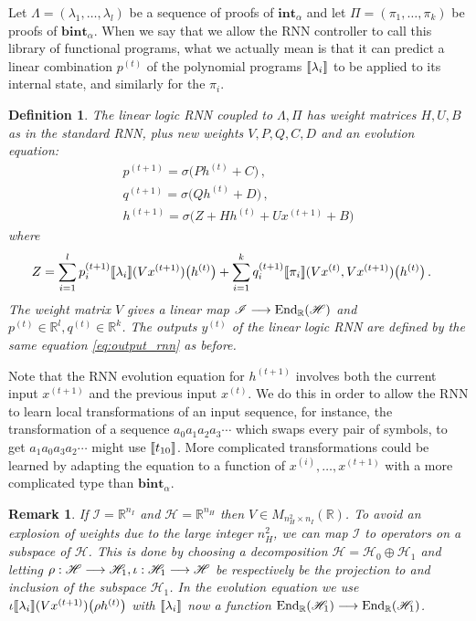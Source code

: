 \documentclass[english,letter paper,12pt,leqno]{article}
\theoremstyle{example}
\newtheorem{definition}[theorem]{Definition}
\newtheorem{remark}[theorem]{Remark}
\numberwithin{equation}{section}
\DeclareMathOperator{\End}{End}
\begin{document}
Let $\Lambda = (\lambda_1,\ldots,\lambda_l)$ be a sequence of proofs of $\textbf{int}_\alpha$ and let $\Pi = (\pi_1,\ldots,\pi_k)$ be proofs of $\textbf{bint}_\alpha$. When we say that we allow the RNN controller to call this library of functional programs, what we actually mean is that it can predict a linear combination $p^{(t)}$ of the polynomial programs $\llbracket \lambda_i \rrbracket$ to be applied to its internal state, and similarly for the $\pi_i$.

\begin{definition} The \emph{linear logic} RNN coupled to $\Lambda, \Pi$ has weight matrices $H,U,B$ as in the standard RNN, plus new weights $V, P, Q, C, D$ and an evolution equation:
\begin{gather*}
p^{(t+1)} = \sigma\big( P h^{(t)} + C \big)\,,\\
q^{(t+1)} = \sigma\big( Q h^{(t)} + D \big)\,,\\
h^{(t+1)} = \sigma\Big( Z + H h^{(t)} + U x^{(t+1)} + B\Big)
\end{gather*}
where
\begin{align*}
Z &= \sum_{i=1}^l p^{(t+1)}_i \llbracket \lambda_i \rrbracket( Vx^{(t+1)} )\big( h^{(t)} \big) + \sum_{i=1}^k q^{(t+1)}_i \llbracket \pi_i \rrbracket( Vx^{(t)}, Vx^{(t+1)})\big( h^{(t)} \big)\,.
\end{align*}
The weight matrix $V$ gives a linear map $\mathscr{I} \lto \End_{\mathbb{R}}(\mathscr{H})$ and $p^{(t)} \in \mathbb{R}^l, q^{(t)} \in \mathbb{R}^k$. The outputs $y^{(t)}$ of the linear logic RNN are defined by the same equation \eqref{eq:output_rnn} as before.
\end{definition}

Note that the RNN evolution equation for $h^{(t+1)}$ involves both the current input $x^{(t+1)}$ and the previous input $x^{(t)}$. We do this in order to allow the RNN to learn local transformations of an input sequence, for instance, the transformation of a sequence $a_0 a_1 a_2 a_3 \cdots$ which swaps every pair of symbols, to get $a_1 a_0 a_3 a_2 \cdots$ might use $\llbracket t_{10} \rrbracket$. More complicated transformations could be learned by adapting the equation to a function of $x^{(i)}, \ldots, x^{(t+1)}$ with a more complicated type than $\textbf{bint}_\alpha$.

\begin{remark} If $\mathscr{I} = \mathbb{R}^{n_I}$ and $\mathscr{H} = \mathbb{R}^{n_H}$ then $V \in M_{n_H^2 \times n_I}(\mathbb{R})$. To avoid an explosion of weights due to the large integer $n_H^2$, we can map $\mathscr{I}$ to operators on a subspace of $\mathscr{H}$. This is done by choosing a decomposition $\mathscr{H} = \mathscr{H}_0 \oplus \mathscr{H}_1$ and letting $\rho: \mathscr{H} \longrightarrow \mathscr{H}_1, \iota: \mathscr{H}_1 \longrightarrow \mathscr{H}$ be respectively be the projection to and inclusion of the subspace $\mathscr{H}_1$. In the evolution equation we use $\iota \llbracket \lambda_i \rrbracket( Vx^{(t+1)} )\big( \rho h^{(t)} \big)$ with $\llbracket \lambda_i \rrbracket$ now a function $\End_{\mathbb{R}}(\mathscr{H}_1) \lto \End_{\mathbb{R}}(\mathscr{H}_1)$.
\end{remark}
\end{document}
